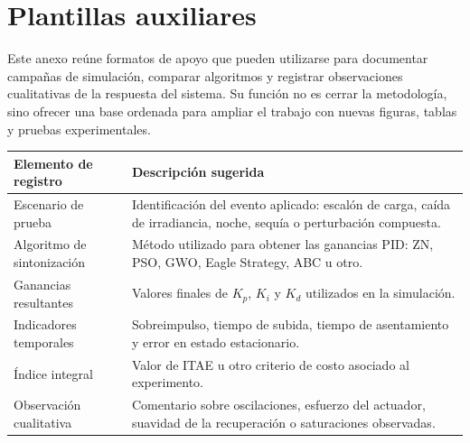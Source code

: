 \chapter{Plantillas auxiliares}
\label{anx:plantillas}

Este anexo reúne formatos de apoyo que pueden utilizarse para documentar campañas de
simulación, comparar algoritmos y registrar observaciones cualitativas de la respuesta del
sistema. Su función no es cerrar la metodología, sino ofrecer una base ordenada para ampliar
el trabajo con nuevas figuras, tablas y pruebas experimentales.

\begin{longtable}{p{}p{}}
\toprule
\textbf{Elemento de registro} & \textbf{Descripción sugerida} \\
\midrule
Escenario de prueba & Identificación del evento aplicado: escalón de carga, caída de irradiancia, noche, sequía o perturbación compuesta. \\
Algoritmo de sintonización & Método utilizado para obtener las ganancias PID: ZN, PSO, GWO, Eagle Strategy, ABC u otro. \\
Ganancias resultantes & Valores finales de $K_p$, $K_i$ y $K_d$ utilizados en la simulación. \\
Indicadores temporales & Sobreimpulso, tiempo de subida, tiempo de asentamiento y error en estado estacionario. \\
Índice integral & Valor de ITAE u otro criterio de costo asociado al experimento. \\
Observación cualitativa & Comentario sobre oscilaciones, esfuerzo del actuador, suavidad de la recuperación o saturaciones observadas. \\
\bottomrule
\end{longtable}
